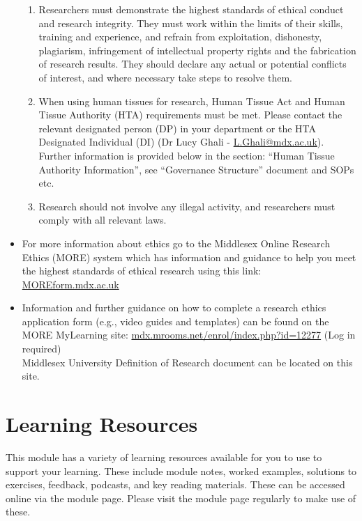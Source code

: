 \documentclass{MDXHandbook}
\begin{document}
\begin{itemize}
\begin{enumerate}
			\item Researchers must demonstrate the highest standards of ethical conduct and research integrity. They must work within the limits of their skills, training and experience, and refrain from exploitation, dishonesty, plagiarism, infringement of intellectual property rights and the fabrication of research results. They should declare any actual or potential conflicts of interest, and where necessary take steps to resolve them. 
			\item When using human tissues for research, Human Tissue Act and Human Tissue Authority (HTA) requirements must be met. Please contact the relevant designated person (DP) in your department or the HTA Designated Individual (DI) (Dr Lucy Ghali - \href{mailto:L.Ghali@mdx.ac.uk}{L.Ghali@mdx.ac.uk}). Further information is provided below in the section: ``Human Tissue Authority Information'', see ``Governance Structure'' document and SOPs etc.
			\item Research should not involve any illegal activity, and researchers must comply with all relevant laws.
		\end{enumerate}
	\item For more information about ethics go to the Middlesex Online Research Ethics (MORE) system which has information and guidance to help you meet the highest standards of ethical research using this link: \url{MOREform.mdx.ac.uk}
	\item Information and further guidance on how to complete a research ethics application form (e.g., video guides and templates) can be found on the MORE MyLearning site\textsuperscript{\ast}: \url{mdx.mrooms.net/enrol/index.php?id=12277} (Log in required)\\ 
\textsuperscript{\ast}Middlesex University Definition of Research document can be located on this site.
\end{itemize}



\section{Learning Resources}

This module has a variety of learning resources available for you to use to support your learning. These include module notes, worked examples, solutions to exercises, feedback, podcasts, and key reading materials. These can be accessed online via the module page. Please visit the module page regularly to make use of these.
\end{document}
